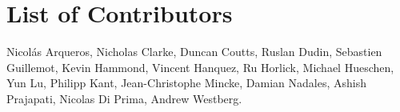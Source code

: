 \section*{List of Contributors}
\label{acknowledgements}

Nicol\'as Arqueros,
Nicholas Clarke,
Duncan Coutts,
Ruslan Dudin,
Sebastien Guillemot,
Kevin Hammond,
Vincent Hanquez,
Ru Horlick,
Michael Hueschen,
Yun Lu,
Philipp Kant,
Jean-Christophe Mincke,
Damian Nadales,
Ashish Prajapati,
Nicolas Di Prima,
Andrew Westberg.
